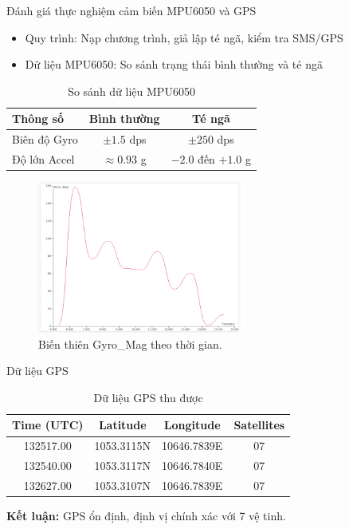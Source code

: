 \begin{frame}{Đánh giá thực nghiệm cảm biến MPU6050 và GPS}
    \begin{itemize}
        \item Quy trình: Nạp chương trình, giả lập té ngã, kiểm tra SMS/GPS
        \item Dữ liệu MPU6050: So sánh trạng thái bình thường và té ngã
    \end{itemize}
    \begin{table}
        \centering
        \caption{So sánh dữ liệu MPU6050}
        \begin{tabular}{|l|c|c|}
            \hline
            \textbf{Thông số} & \textbf{Bình thường} & \textbf{Té ngã} \\
            \hline
            Biên độ Gyro & $\pm 1.5$ dps & $\pm 250$ dps \\
            \hline
            Độ lớn Accel & $\approx 0.93$ g & $-2.0$ đến $+1.0$ g \\
            \hline
        \end{tabular}
    \end{table}
    \begin{figure}
        \centering
        \includegraphics[width=0.6\textwidth]{images/gyro_time.png}
        \caption{Biến thiên Gyro\_Mag theo thời gian.}
    \end{figure}
\end{frame}

\begin{frame}{Dữ liệu GPS}
    \begin{table}
        \centering
        \caption{Dữ liệu GPS thu được}
        \begin{tabular}{|c|c|c|c|}
            \hline
            \textbf{Time (UTC)} & \textbf{Latitude} & \textbf{Longitude} & \textbf{Satellites} \\
            \hline
            132517.00 & 1053.3115N & 10646.7839E & 07 \\
            132540.00 & 1053.3117N & 10646.7840E & 07 \\
            132627.00 & 1053.3107N & 10646.7839E & 07 \\
            \hline
        \end{tabular}
    \end{table}
    \textbf{Kết luận:} GPS ổn định, định vị chính xác với 7 vệ tinh.
\end{frame}

